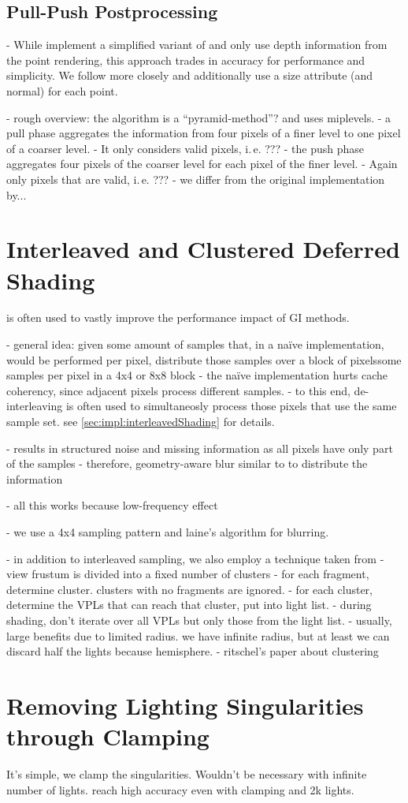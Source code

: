 \subsection{Pull-Push Postprocessing}

- While \citep{ritschel2008ism} implement a simplified variant of \citet{Marroquim:2007:reconstruction} and only use depth information from the point rendering, this approach trades in accuracy for performance and simplicity. We follow \citet{Marroquim:2007:reconstruction} more closely and additionally use a size attribute (and normal) for each point.

- rough overview: the algorithm is a ``pyramid-method''? and uses miplevels.
- a pull phase aggregates the information from four pixels of a finer level to one pixel of a coarser level.
- It only considers valid pixels, i.\,e. ???
- the push phase aggregates four pixels of the coarser level for each pixel of the finer level.
- Again only pixels that are valid, i.\,e. ???
- we differ from the original implementation by...



\section{Interleaved and Clustered Deferred Shading}
\label{sec:interleavedAndClusteredShading}
\citep{Keller:2001:InterleavedSampling} is often used to vastly improve the performance impact of GI methods. 

- general idea: given some amount of samples that, in a naïve implementation, would be performed per pixel, distribute those samples over a block of pixelssome samples per pixel in a 4x4 or 8x8 block
- the naïve implementation hurts cache coherency, since adjacent pixels process different samples.
- to this end, de-interleaving is often used to simultaneosly process those pixels that use the same sample set. see \ref{sec:impl:interleavedShading} for details.

- results in structured noise and missing information as all pixels have only part of the samples
- therefore, geometry-aware blur similar to \citet{laine2007incremental} to distribute the information

- all this works because low-frequency effect

- we use a 4x4 sampling pattern and laine's algorithm for blurring.


- in addition to interleaved sampling, we also employ a technique taken from \citet{olsson2012clustered}
- view frustum is divided into a fixed number of clusters
- for each fragment, determine cluster. clusters with no fragments are ignored.
- for each cluster, determine the VPLs that can reach that cluster, put into light list.
- during shading, don't iterate over all VPLs but only those from the light list.
- usually, large benefits due to limited radius. we have infinite radius, but at least we can discard half the lights because hemisphere.
- ritschel's paper about clustering

\section{Removing Lighting Singularities through Clamping}
\label{sec:clamping}
It's simple, we clamp the singularities. Wouldn't be necessary with infinite number of lights. \citet{hedman2016sequential} reach high accuracy even with clamping and 2k lights.
